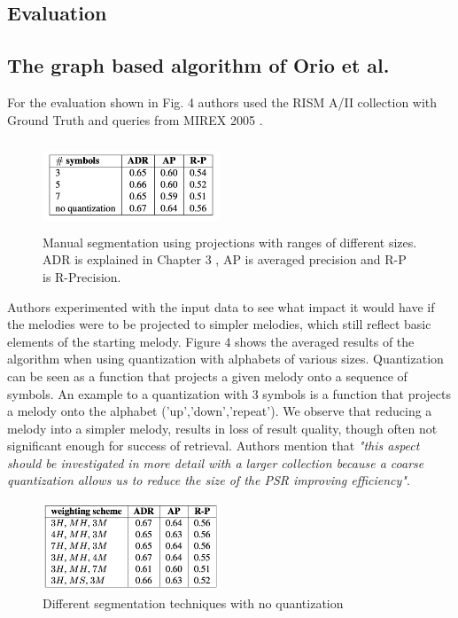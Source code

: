 \documentclass{llncs}
\begin{document}
\begin{itemize}
			
	\section{Evaluation}
		\subsection{The graph based algorithm of Orio et al.}
			For the evaluation shown in Fig. 4 authors used the RISM A/II collection with Ground Truth and queries from MIREX 2005 \cite{three}.
			
			\begin{figure}[h!]
			\centering
			\includegraphics[width=200px,height=100px,keepaspectratio]{one_of_two_point_four}
			\caption{Manual segmentation using projections with ranges of different sizes.\cite{two_point_four} ADR is explained in Chapter 3 , AP is averaged precision and R-P is R-Precision.}
			\end{figure}
            
            Authors experimented with the input data to see what impact it would have if the melodies were to be projected to simpler melodies, which still reflect basic elements of the starting melody. Figure 4 shows the averaged results of the algorithm when using quantization with alphabets of various sizes. Quantization can be seen as a function that projects a given melody onto a sequence of symbols. An example to a quantization with 3 symbols is a function that projects a melody onto the alphabet ('up','down','repeat'). We observe that reducing a melody into a simpler melody, results in loss of result quality, though often not significant enough for success of retrieval. Authors mention that \textit{"this aspect should be investigated in more detail with a larger collection because a coarse quantization allows us to reduce the size of the PSR improving efficiency"}.

			\begin{figure}[h!]
			\centering
			\includegraphics[width=200px,height=100px,keepaspectratio]{three_of_two_point_four}
			\caption{Different segmentation techniques with no quantization \cite{two_point_four}}
			\end{figure}


\end{itemize}
\end{document}
